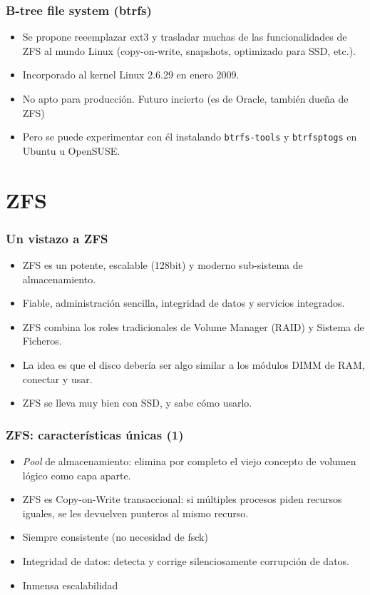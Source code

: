\documentclass{beamer}
\begin{document}
\begin{frame}
  \frametitle{B-tree file system (btrfs)}
  \begin{itemize}
    \item Se propone reeemplazar ext3 y trasladar muchas de las funcionalidades de ZFS al mundo Linux (copy-on-write, snapshots, optimizado para SSD, etc.).
    \item Incorporado al kernel Linux 2.6.29 en enero 2009.
    \item  No apto para producción. Futuro incierto (es de Oracle, también dueña de ZFS)
    \item Pero se puede experimentar con él instalando \texttt{btrfs-tools} y \texttt{btrfsptogs} en Ubuntu u OpenSUSE. 
  \end{itemize}

\end{frame}



\section{ZFS}


\begin{frame}
  \frametitle{Un vistazo a ZFS}
  \begin{itemize}
    \item ZFS es un potente, escalable (128bit) y moderno sub-sistema de almacenamiento.
    \item Fiable, administración sencilla, integridad de datos y servicios integrados.
    \item ZFS combina los roles tradicionales de Volume Manager (RAID) y Sistema de Ficheros.
    \item La idea es que el disco debería ser algo similar a los módulos DIMM de RAM, conectar y usar.
    \item ZFS se lleva muy bien con SSD, y sabe cómo usarlo.
    
  \end{itemize}
\end{frame}



\begin{frame}
  \frametitle{ZFS: características únicas (1)}
  \begin{itemize}
    \item \textit{Pool} de almacenamiento: elimina por completo el viejo concepto de volumen lógico como capa aparte.
    \item ZFS es Copy-on-Write transaccional: si múltiples procesos piden recursos iguales, se les devuelven punteros al mismo recurso. 
    \item Siempre consistente (no necesidad de fsck)
    \item Integridad de datos: detecta y corrige silenciosamente corrupción de datos.
    \item Inmensa escalabilidad
  \end{itemize}

\end{frame}
\end{document}
